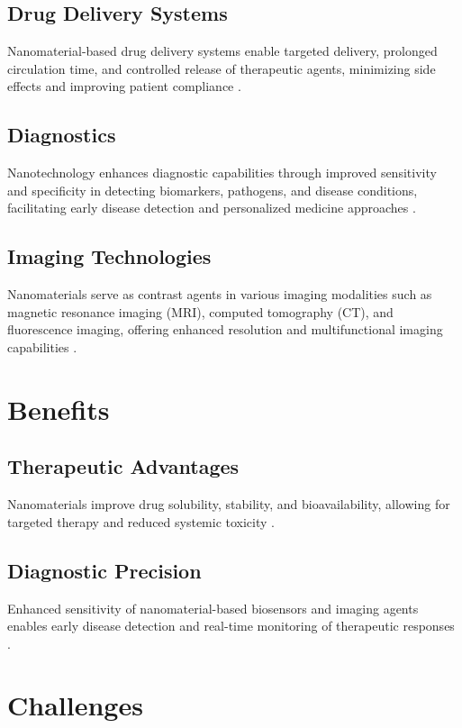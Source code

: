\documentclass[12pt]{article}
\begin{document}
\subsection{Drug Delivery Systems}
Nanomaterial-based drug delivery systems enable targeted delivery, prolonged circulation time, and controlled release of therapeutic agents, minimizing side effects and improving patient compliance \citep{wang2018nanoparticle, allen2017nanoparticle}.

\subsection{Diagnostics}
Nanotechnology enhances diagnostic capabilities through improved sensitivity and specificity in detecting biomarkers, pathogens, and disease conditions, facilitating early disease detection and personalized medicine approaches \citep{cao2019nanomaterials, kwizera2020nanomaterials}.

\subsection{Imaging Technologies}
Nanomaterials serve as contrast agents in various imaging modalities such as magnetic resonance imaging (MRI), computed tomography (CT), and fluorescence imaging, offering enhanced resolution and multifunctional imaging capabilities \citep{choi2008gold, tsourkas2005magneto}.

\section{Benefits}
\subsection{Therapeutic Advantages}
Nanomaterials improve drug solubility, stability, and bioavailability, allowing for targeted therapy and reduced systemic toxicity \citep{dreaden2012nanotechnology, moore2014nanotechnology}.

\subsection{Diagnostic Precision}
Enhanced sensitivity of nanomaterial-based biosensors and imaging agents enables early disease detection and real-time monitoring of therapeutic responses \citep{bai2017nanomaterials, medintz2005nanomaterials}.

\section{Challenges}
\end{document}
